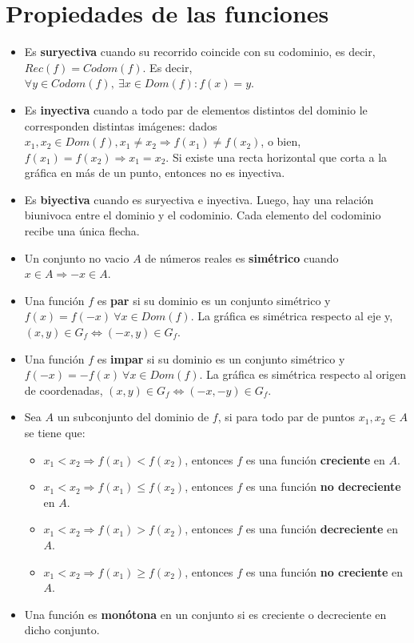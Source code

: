 \documentclass[11pt,a4paper]{article}
\begin{document}
\section{Propiedades de las funciones}
\begin{itemize}
\item Es \textbf{suryectiva} cuando su recorrido coincide con su codominio, es decir, $Rec(f) = Codom(f)$. Es decir, $\forall y \in Codom(f),\ \exists x \in Dom(f) : f(x) = y$.
\item Es \textbf{inyectiva} cuando a todo par de elementos distintos del dominio le corresponden distintas im\'agenes: dados $x_1,x_2 \in Dom(f), x_1 \not = x_2 \Rightarrow f(x_1) \not = f(x_2)$, o bien, $f(x_1) = f(x_2) \Rightarrow x_1 = x_2$. Si existe una recta horizontal que corta a la gr\'afica en m\'as de un punto, entonces no es inyectiva.
\item Es \textbf{biyectiva} cuando es suryectiva e inyectiva. Luego, hay una relaci\'on biunivoca entre el dominio y el codominio. Cada elemento del codominio recibe una \'unica flecha.\\

\item Un conjunto no vacio $A$ de n\'umeros reales es \textbf{sim\'etrico} cuando $x \in A \Rightarrow -x \in A$.
\item Una funci\'on $f$ es \textbf{par} si su dominio es un conjunto sim\'etrico y $f(x) = f(-x)\ \forall x \in Dom(f)$. La gr\'afica es sim\'etrica respecto al eje y, $(x, y) \in G_f \iff (-x, y) \in G_f$.
\item Una funci\'on $f$ es \textbf{impar} si su dominio es un conjunto sim\'etrico y $f(-x) = -f(x)\ \forall x \in Dom(f)$. La gr\'afica es sim\'etrica respecto al origen de coordenadas, $(x,y) \in G_f \iff (-x,-y) \in G_f$.\\

\item Sea $A$ un subconjunto del dominio de $f$, si para todo par de puntos $x_1, x_2 \in A$ se tiene que:
\begin{itemize}
\item $x_1 < x_2 \Rightarrow f(x_1) < f(x_2)$, entonces $f$ es una funci\'on \textbf{creciente} en $A$.
\item $x_1 < x_2 \Rightarrow f(x_1) \leq f(x_2)$, entonces $f$ es una funci\'on \textbf{no decreciente} en $A$.
\item $x_1 < x_2 \Rightarrow f(x_1) > f(x_2)$, entonces $f$ es una funci\'on \textbf{decreciente} en $A$.
\item $x_1 < x_2 \Rightarrow f(x_1) \geq f(x_2)$, entonces $f$ es una funci\'on \textbf{no creciente} en $A$.
\end{itemize}
\item Una funci\'on es \textbf{mon\'otona} en un conjunto si es creciente o decreciente en dicho conjunto.
\end{itemize}
\end{document}
